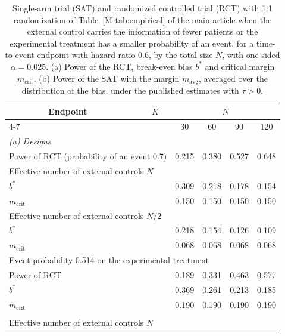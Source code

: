 \begin{table}[!htb]
\centering
\footnotesize
\setlength{\tabcolsep}{4pt}
\caption{Single-arm trial (SAT) and randomized controlled trial (RCT) with 1:1 randomization of Table~\ref{M-tab:empirical} of the main article when the external control carries the information of fewer patients or the experimental treatment has a smaller probability of an event, for a time-to-event endpoint with hazard ratio 0.6, by the total size $N$, with one-sided $\alpha = 0.025$. (a) Power of the RCT, break-even bias $b^{*}$ and critical margin $m_{\mathrm{crit}}$. (b) Power of the SAT with the margin $m_{\mathrm{avg}}$, averaged over the distribution of the bias, under the published estimates with $\tau > 0$.}
\label{tab:design_sensitivity}
\begin{tabular}{llccccc}
\toprule
 & Endpoint & $K$ & \multicolumn{4}{c}{$N$} \\
\cmidrule(lr){4-7}
 & & & 30 & 60 & 90 & 120 \\
\midrule
\multicolumn{7}{l}{\textit{(a) Designs}} \\
\multicolumn{3}{l}{Power of RCT (probability of an event 0.7)} & 0.215 & 0.380 & 0.527 & 0.648 \\
\multicolumn{7}{l}{Effective number of external controls $N$} \\
\multicolumn{3}{l}{\quad $b^{*}$} & 0.309 & 0.218 & 0.178 & 0.154 \\
\multicolumn{3}{l}{\quad $m_{\mathrm{crit}}$} & 0.150 & 0.150 & 0.150 & 0.150 \\
\multicolumn{7}{l}{Effective number of external controls $N/2$} \\
\multicolumn{3}{l}{\quad $b^{*}$} & 0.218 & 0.154 & 0.126 & 0.109 \\
\multicolumn{3}{l}{\quad $m_{\mathrm{crit}}$} & 0.068 & 0.068 & 0.068 & 0.068 \\
\multicolumn{7}{l}{Event probability 0.514 on the experimental treatment} \\
\multicolumn{3}{l}{\quad Power of RCT} & 0.189 & 0.331 & 0.463 & 0.577 \\
\multicolumn{3}{l}{\quad $b^{*}$} & 0.369 & 0.261 & 0.213 & 0.185 \\
\multicolumn{3}{l}{\quad $m_{\mathrm{crit}}$} & 0.190 & 0.190 & 0.190 & 0.190 \\
\addlinespace
\multicolumn{7}{l}{\textit{(b) Power of the SAT with $m_{\mathrm{avg}}$, averaged over the distribution of the bias}} \\
\multicolumn{7}{l}{Effective number of external controls $N$} \\

\end{tabular}
\end{table}
